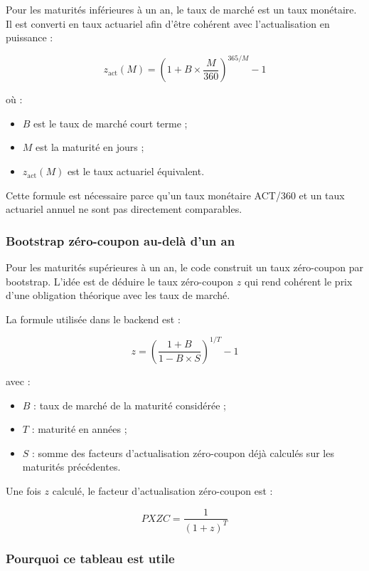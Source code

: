 \documentclass[12pt,a4paper]{article}
\begin{document}
Pour les maturités inférieures à un an, le taux de marché est un taux monétaire. Il est converti en taux actuariel afin d'être cohérent avec l'actualisation en puissance :

\[
z_{\text{act}}(M)
=
\left(1 + B \times \frac{M}{360}\right)^{365/M} - 1
\]

où :

\begin{itemize}
    \item $B$ est le taux de marché court terme ;
    \item $M$ est la maturité en jours ;
    \item $z_{\text{act}}(M)$ est le taux actuariel équivalent.
\end{itemize}

Cette formule est nécessaire parce qu'un taux monétaire ACT/360 et un taux actuariel annuel ne sont pas directement comparables.

\subsubsection*{Bootstrap zéro-coupon au-delà d'un an}

Pour les maturités supérieures à un an, le code construit un taux zéro-coupon par bootstrap. L'idée est de déduire le taux zéro-coupon $z$ qui rend cohérent le prix d'une obligation théorique avec les taux de marché.

La formule utilisée dans le backend est :

\[
z
=
\left(
\frac{1+B}{1-B \times S}
\right)^{1/T}
- 1
\]

avec :

\begin{itemize}
    \item $B$ : taux de marché de la maturité considérée ;
    \item $T$ : maturité en années ;
    \item $S$ : somme des facteurs d'actualisation zéro-coupon déjà calculés sur les maturités précédentes.
\end{itemize}

Une fois $z$ calculé, le facteur d'actualisation zéro-coupon est :

\[
PXZC
=
\frac{1}{(1+z)^T}
\]

\subsubsection*{Pourquoi ce tableau est utile}
\end{document}
